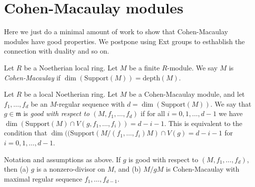 \section{Cohen-Macaulay modules}
\label{section-CM}

\noindent
Here we just do a minimal amount of work to show that
Cohen-Macaulay modules have good properties. We postpone
using Ext groups to esthablish the connection with duality
and so on.

\begin{definition}
\label{definition-CM}
Let $R$ be a Noetherian local ring.
Let $M$ be a finite $R$-module.
We say $M$ is {\it Cohen-Macaulay}
if $\dim(\text{Support}(M)) = \text{depth}(M)$.
\end{definition}

\noindent
Let $R$ be a local Noetherian ring. Let $M$ be
a Cohen-Macaulay module, and let $f_1,\ldots,f_d$
be an $M$-regular sequence with $d = \dim(\text{Support}(M))$.
We say that $g \in \mathfrak m$ is {\it good with respect to
$(M, f_1,\ldots,f_d)$} if for all $i = 0, 1, \ldots, d-1$
we have $\dim (\text{Support}(M) \cap V(g,f_1,\ldots,f_i))
= d - i - 1$. This is equivalent to the condition that
$\dim((\text{Support}(M/(f_1,\ldots,f_i)M) \cap V(g) =
d - i -1$ for $i = 0, 1, \ldots, d-1$.

\begin{lemma}
\label{lemma-good-element}
Notation and assumptions as above. If $g$ is good with respect to
$(M, f_1,\ldots,f_d)$, then (a) $g$ is a nonzero-divisor on $M$,
and (b) $M/gM$ is Cohen-Macaulay with maximal regular
sequence $f_1,\ldots,f_{d-1}$.
\end{lemma}

